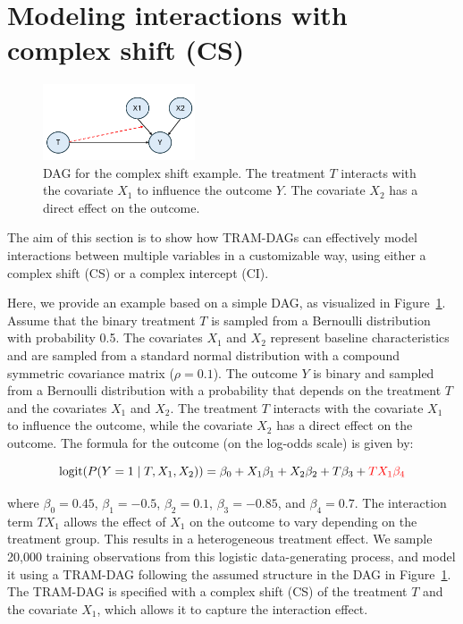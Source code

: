 \section{Modeling interactions with complex shift (CS)} \label{sec:complex_shift}


\begin{figure}[htbp]
\centering
\includegraphics[width=0.4\textwidth]{img/appendix_dag_cs_interaction.png}
\caption{DAG for the complex shift example. The treatment $T$ interacts with the covariate $X_1$ to influence the outcome $Y$. The covariate $X_2$ has a direct effect on the outcome.}
\label{fig:complex_shift_dag}
\end{figure}


The aim of this section is to show how TRAM-DAGs can effectively model interactions between multiple variables in a customizable way, using either a complex shift (CS) or a complex intercept (CI). 

Here, we provide an example based on a simple DAG, as visualized in Figure~\ref{fig:complex_shift_dag}. Assume that the binary treatment $T$ is sampled from a Bernoulli distribution with probability 0.5. The covariates $X_1$ and $X_2$ represent baseline characteristics and are sampled from a standard normal distribution with a compound symmetric covariance matrix ($\rho = 0.1$). The outcome $Y$ is binary and sampled from a Bernoulli distribution with a probability that depends on the treatment $T$ and the covariates $X_1$ and $X_2$. The treatment $T$ interacts with the covariate $X_1$ to influence the outcome, while the covariate $X_2$ has a direct effect on the outcome. The formula for the outcome (on the log-odds scale) is given by:



\[
\text{logit}(P(Y=1 \mid T, X_1, X_2)) = \beta_0 + X_1 \beta_1 + X_2 \beta_2 + T \beta_3 + \textcolor{red}{T X_1\beta_4}
\]

where $\beta_0 = 0.45$, $\beta_1 = -0.5$, $\beta_2 = 0.1$, $\beta_3 = -0.85$, and $\beta_4 = 0.7$. The interaction term $T X_1$ allows the effect of $X_1$ on the outcome to vary depending on the treatment group. This results in a heterogeneous treatment effect. 
We sample 20,000 training observations from this logistic data-generating process, and model it using a TRAM-DAG following the assumed structure in the DAG in Figure~\ref{fig:complex_shift_dag}. The TRAM-DAG is specified with a complex shift (CS) of the treatment $T$ and the covariate $X_1$, which allows it to capture the interaction effect.

